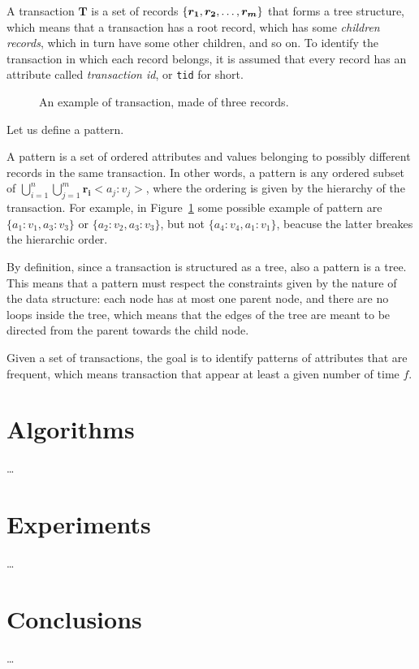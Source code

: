 \documentclass{acm_proc_article-sp-sigmod09}
\begin{document}
A transaction $\boldsymbol{T}$ is a set of records $\{\boldsymbol{r_1}, \boldsymbol{r_2}, \text{\dots}, \boldsymbol{r_m}\}$ that forms a tree structure, which means that a transaction has a root record, which has some \emph{children records}, which in turn have some other children, and so on. To identify the transaction in which each record belongs, it is assumed that every record has an attribute called \emph{transaction id}, or \texttt{tid} for short.

\begin{figure}
\centering
{}
\caption{An example of transaction, made of three records.}
\label{fig:transaction}
\end{figure}

Let us define a pattern.
\begin{definition}
A pattern is a set of ordered attributes and values belonging to possibly different records in the same transaction. In other words, a pattern is any ordered subset of $\bigcup\limits_{i=1}^{n} \bigcup\limits_{j=1}^{m} \boldsymbol{r_i}<a_j \colon v_j>$, where the ordering is given by the hierarchy of the transaction. For example, in Figure~\ref{fig:transaction} some possible example of pattern are $\{a_1 \colon v_1, a_3 \colon v_3\}$ or $\{a_2 \colon v_2, a_3 \colon v_3\}$, but not $\{a_4 \colon v_4, a_1 \colon v_1\}$, beacuse the latter breakes the hierarchic order.

By definition, since a transaction is structured as a tree, also a pattern is a tree. This means that a pattern must respect the constraints given by the nature of the data structure: each node has at most one parent node, and there are no loops inside the tree, which means that the edges of the tree are meant to be directed from the parent towards the child node.
\end{definition}

Given a set of transactions, the goal is to identify patterns of attributes that are frequent, which means transaction that appear at least a given number of time $f$.

\section{Algorithms}
\dots

\section{Experiments}
\dots

\section{Conclusions}
\dots

%

\end{document}

